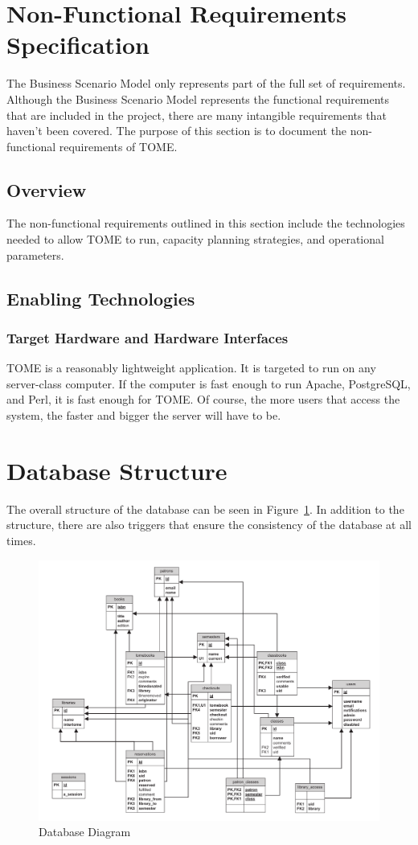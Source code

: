 \documentclass[12pt,titlepage]{article}
\begin{document}
\section{Non-Functional Requirements Specification}
The Business Scenario Model only represents part of the full set of requirements.  Although the Business Scenario Model represents the functional requirements that are included in the project, there are many intangible requirements that haven’t been covered.  The purpose of this section is to document the non-functional requirements of TOME.
\subsection{Overview}
The non-functional requirements outlined in this section include the technologies needed to allow TOME to run, capacity planning strategies, and operational parameters.
\subsection{Enabling Technologies}
\subsubsection{Target Hardware and Hardware Interfaces}
TOME is a reasonably lightweight application.  It is targeted to run on any server-class computer.  If the computer is fast enough to run Apache, PostgreSQL, and Perl, it is fast enough for TOME.  Of course, the more users that access the system, the faster and bigger the server will have to be.

\section{Database Structure}
\label{tomedbsection}
The overall structure of the database can be seen in Figure~\ref{tomedb}.  In addition to the structure, there are also triggers that ensure the consistency of the database at all times.
\begin{figure}[h]
	\includegraphics[width=\textwidth]{tomedb}
	\caption{Database Diagram}
	\label{tomedb}
\end{figure}
\end{document}
